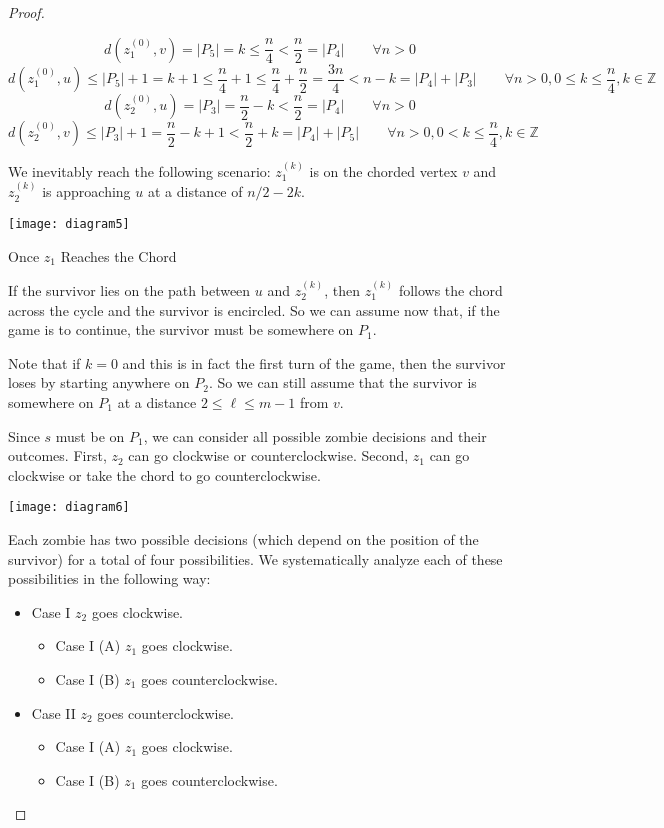 \documentclass[letterpaper, 10pt]{article}
\newcommand{\Z}{\mathbb{Z}}
\begin{document}
\begin{proof}
\begin{proofpart}
\[ d(z_1^{(0)}, v) = |P_5| = k \leq \frac{n}{4} < \frac{n}{2} = |P_4| \qquad \forall n > 0\]
\[ d(z_1^{(0)}, u) \leq |P_5| + 1 = k + 1 \leq \frac{n}{4} +1 \leq \frac{n}{4} + \frac{n}{2} = \frac{3n}{4} < n -k = |P_4| + |P_3| \qquad \forall n > 0, 0 \leq k \leq \frac{n}{4}, k \in \Z\]
\[ d(z_2^{(0)}, u) = |P_3| = \frac{n}{2} - k < \frac{n}{2} = |P_4| \qquad \forall n > 0\]
\[ d(z_2^{(0)}, v) \leq |P_3| + 1 = \frac{n}{2} - k + 1 < \frac{n}{2} + k = |P_4| + |P_5| \qquad \forall n > 0, 0 < k \leq \frac{n}{4}, k \in \Z\]

We inevitably reach the following scenario: $z_1^{(k)}$ is on the chorded vertex $v$
and $z_2^{(k)}$ is approaching $u$ at a distance of $n/2 -2k$.

\begin{center}
\texttt{[image: diagram5]}
\end{center}

\end{proofpart}

\begin{proofpart} Once $z_1$ Reaches the Chord

If the survivor lies on the path between $u$ and $z_2^{(k)}$, then
$z_1^{(k)}$ follows the chord across the cycle and the survivor is encircled.
So we can assume now that, if the game is to continue, the survivor must be
somewhere on $P_1$.

Note that if $k=0$ and this is in fact the first turn of the game, then
the survivor loses by starting anywhere on $P_2$. So we can still assume
that the survivor is somewhere on $P_1$ at a distance $2 \leq \ell \leq m-1$ from $v$.

Since $s$ must be on $P_1$, we can consider all possible zombie decisions and their outcomes.
First, $z_2$ can go clockwise or counterclockwise.
Second, $z_1$ can go clockwise or take the chord to go counterclockwise.

\begin{center}
\texttt{[image: diagram6]}
\end{center}

Each zombie has two possible decisions (which depend on the position of the survivor)
for a total of four possibilities. We systematically analyze each of these possibilities
in the following way:

\begin{itemize}
  \item Case I $z_2$ goes clockwise.
  \begin{itemize}
    \item Case I (A) $z_1$ goes clockwise.
    \item Case I (B) $z_1$ goes counterclockwise.
  \end{itemize}
  \item Case II $z_2$ goes counterclockwise.
  \begin{itemize}
    \item Case I (A) $z_1$ goes clockwise.
    \item Case I (B) $z_1$ goes counterclockwise.
  \end{itemize}
\end{itemize}


\end{proofpart}
\end{proof}
\end{document}
